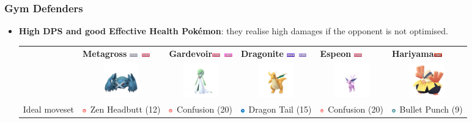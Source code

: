 \documentclass[8pt,aspectratio=169,compress]{beamer}
\newcommand{\fightingfull}{\includegraphics[height=0.15cm]{../../images/type/full/Fighting.png}}
\newcommand{\fairyfull}{\includegraphics[height=0.15cm]{../../images/type/full/Fairy.png}}
\newcommand{\flyingfull}{\includegraphics[height=0.15cm]{../../images/type/full/Flying.png}}
\newcommand{\dragonfull}{\includegraphics[height=0.15cm]{../../images/type/full/Dragon.png}}
\newcommand{\psychicfull}{\includegraphics[height=0.15cm]{../../images/type/full/Psychic.png}}
\newcommand{\steelfull}{\includegraphics[height=0.15cm]{../../images/type/full/Steel.png}}
\newcommand{\dragonsimp}{\includegraphics[height=0.15cm]{../../images/type/simplified/dragon.png}}
\newcommand{\psysimp}{\includegraphics[height=0.15cm]{../../images/type/simplified/psy.png}}
\newcommand{\steelsimp}{\includegraphics[height=0.15cm]{../../images/type/simplified/steel.png}}
\begin{document}
\begin{frame}
\frametitle{Gym Defenders}

\begin{block}{}
\begin{tiny}

\begin{itemize}
  \item \textbf{High DPS and good Effective Health Pok\'emon}: they realise high damages if the opponent is not optimised. 

\begin{center}
\begin{tabular}{rp{1.9cm}p{1.9cm}p{1.9cm}p{1.9cm}p{1.9cm}}
& \textbf{Metagross} \hfill \steelfull~\psychicfull &  \textbf{Gardevoir}\hfill \psychicfull~\fairyfull & \textbf{Dragonite} \hfill \dragonfull~\flyingfull & \textbf{Espeon} \hfill \psychicfull & \textbf{Hariyama}\hfill \fightingfull \\ 
&\multicolumn{1}{c}{\includegraphics[width=1.5cm]{../../images/pokemon/Metagross}} &
\multicolumn{1}{c}{\includegraphics[width=1.5cm]{../../images/pokemon/Gardevoir}} &
\multicolumn{1}{c}{\includegraphics[width=1.5cm]{../../images/pokemon/Dragonite}} &
\multicolumn{1}{c}{\includegraphics[width=1.5cm]{../../images/pokemon/Espeon}} &
\multicolumn{1}{c}{\includegraphics[width=1.5cm]{../../images/pokemon/Hariyama}}  \\ \hline
Ideal moveset &  \psysimp~Zen Headbutt (12) & \psysimp~Confusion (20) &  \dragonsimp~Dragon Tail (15) & \psysimp~Confusion (20) & \steelsimp~Bullet Punch (9) \\ 

\end{tabular}
\end{center}
\end{itemize}
\end{tiny}
\end{block}
\end{frame}
\end{document}
